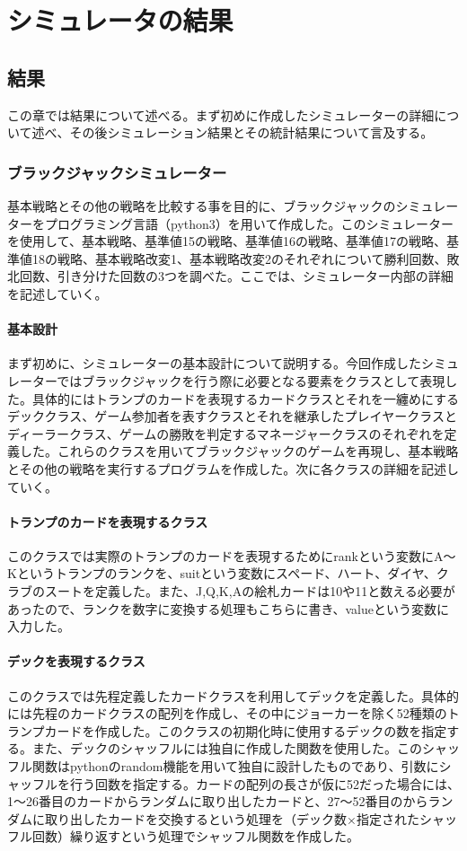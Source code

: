 \chapter{シミュレータの結果}
\section{結果}
この章では結果について述べる。まず初めに作成したシミュレーターの詳細について述べ、その後シミュレーション結果とその統計結果について言及する。

\subsection{ブラックジャックシミュレーター}
基本戦略とその他の戦略を比較する事を目的に、ブラックジャックのシミュレーターをプログラミング言語（python3）を用いて作成した。このシミュレーターを使用して、基本戦略、基準値15の戦略、基準値16の戦略、基準値17の戦略、基準値18の戦略、基本戦略改変1、基本戦略改変2のそれぞれについて勝利回数、敗北回数、引き分けた回数の3つを調べた。ここでは、シミュレーター内部の詳細を記述していく。

\subsubsection{基本設計}
まず初めに、シミュレーターの基本設計について説明する。今回作成したシミュレーターではブラックジャックを行う際に必要となる要素をクラスとして表現した。具体的にはトランプのカードを表現するカードクラスとそれを一纏めにするデッククラス、ゲーム参加者を表すクラスとそれを継承したプレイヤークラスとディーラークラス、ゲームの勝敗を判定するマネージャークラスのそれぞれを定義した。これらのクラスを用いてブラックジャックのゲームを再現し、基本戦略とその他の戦略を実行するプログラムを作成した。次に各クラスの詳細を記述していく。

\subsubsection{トランプのカードを表現するクラス}
このクラスでは実際のトランプのカードを表現するためにrankという変数にA～Kというトランプのランクを、suitという変数にスペード、ハート、ダイヤ、クラブのスートを定義した。また、J,Q,K,Aの絵札カードは10や11と数える必要があったので、ランクを数字に変換する処理もこちらに書き、valueという変数に入力した。

\subsubsection{デックを表現するクラス}
このクラスでは先程定義したカードクラスを利用してデックを定義した。具体的には先程のカードクラスの配列を作成し、その中にジョーカーを除く52種類のトランプカードを作成した。このクラスの初期化時に使用するデックの数を指定する。また、デックのシャッフルには独自に作成した関数を使用した。このシャッフル関数はpythonのrandom機能を用いて独自に設計したものであり、引数にシャッフルを行う回数を指定する。カードの配列の長さが仮に52だった場合には、1～26番目のカードからランダムに取り出したカードと、27～52番目のからランダムに取り出したカードを交換するという処理を（デック数×指定されたシャッフル回数）繰り返すという処理でシャッフル関数を作成した。

